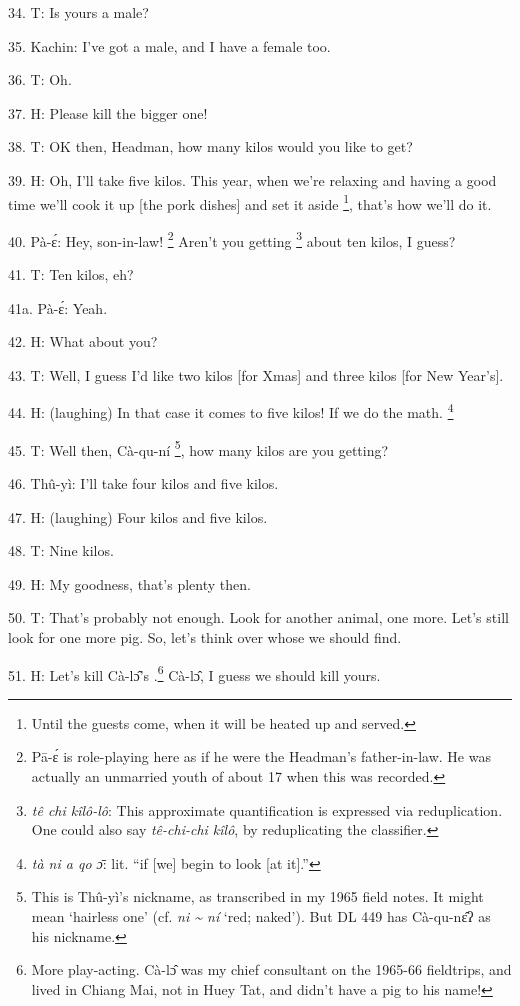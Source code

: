 34. T: Is yours a male?

35. Kachin: I've got a male, and I have a female too.

36. T: Oh.

37. H: Please kill the bigger one!

38. T: OK then, Headman, how many kilos would you like to get?

39. H: Oh, I'll take five kilos.  This year, when we're relaxing and having a good
time we'll cook it up [the pork dishes] and set it aside \footnote{Until the guests come, when it will be heated up and served.}, that's how we'll
do it.

40. Pà-ɛ́: Hey, son-in-law! \footnote{Pā-ɛ́ is role-playing here as if he were the Headman's father-in-law. He was actually an unmarried youth of about 17 when this was recorded.} Aren't you getting \footnote{\textit{tê chi kîlô-lô}: This approximate quantification is expressed via reduplication.  One could also say \textit{tê-chi-chi kîlô}, by reduplicating the classifier.} about ten kilos, I
guess?

41. T: Ten kilos, eh?

41a. Pà-ɛ́: Yeah.

42. H: What about you?

43. T: Well, I guess I'd like two kilos [for Xmas] and three kilos [for New Year's].

44. H: (laughing) In that case it comes to five kilos!  If we do the math. \footnote{\textit{tà ni a qo ɔ̄}: lit. ``if [we] begin to look [at it].''}

45. T: Well then, Cà-qu-ní \footnote{This is Thû-yì's nickname, as transcribed in my 1965 field notes.  It might mean `hairless one' (cf. \textit{ni \textasciitilde{} ní} `red; naked').  But DL 449 has Cà-qu-nɛ̂ʔ as his nickname.}, how many kilos are you getting?

46. Thû-yì: I'll take four kilos and five kilos.

47. H: (laughing) Four kilos and five kilos.

48. T: Nine kilos.

49. H: My goodness, that's plenty then.

50. T: That's probably not enough.  Look for another animal, one more.  Let's still
look for one more pig.  So, let's think over whose we should find.

51. H: Let's kill Cà-lɔ̂'s .\footnote{More play-acting.  Cà-lɔ̂ was my chief consultant on the 1965-66 fieldtrips, and lived in Chiang Mai, not in Huey Tat, and didn't have a pig to his name!} Cà-lɔ̂, I guess we should kill yours.

